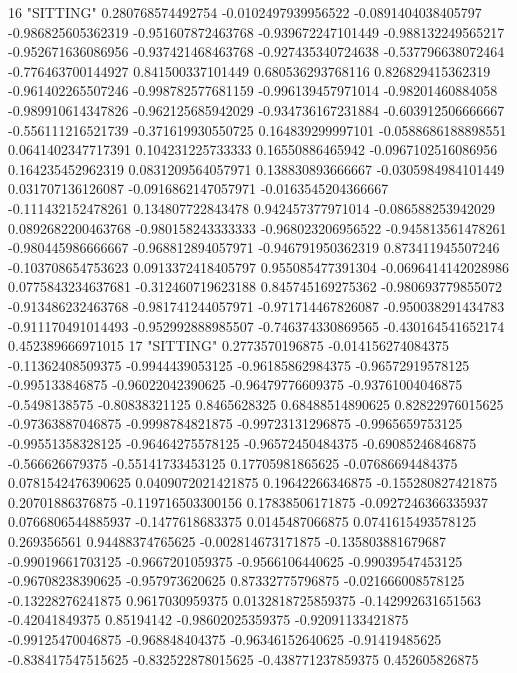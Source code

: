16 "SITTING" 0.280768574492754 -0.0102497939956522 -0.0891404038405797 -0.986825605362319 -0.951607872463768 -0.939672247101449 -0.988132249565217 -0.952671636086956 -0.937421468463768 -0.927435340724638 -0.537796638072464 -0.776463700144927 0.841500337101449 0.680536293768116 0.826829415362319 -0.961402265507246 -0.998782577681159 -0.996139457971014 -0.98201460884058 -0.989910614347826 -0.962125685942029 -0.934736167231884 -0.603912506666667 -0.556111216521739 -0.371619930550725 0.164839299997101 -0.0588686188898551 0.0641402347717391 0.104231225733333 0.16550886465942 -0.0967102516086956 0.164235452962319 0.0831209564057971 0.138830893666667 -0.0305984984101449 0.031707136126087 -0.0916862147057971 -0.0163545204366667 -0.111432152478261 0.134807722843478 0.942457377971014 -0.086588253942029 0.0892682200463768 -0.980158243333333 -0.968023206956522 -0.945813561478261 -0.980445986666667 -0.968812894057971 -0.946791950362319 0.873411945507246 -0.103708654753623 0.0913372418405797 0.955085477391304 -0.0696414142028986 0.0775843234637681 -0.312460719623188 0.845745169275362 -0.980693779855072 -0.913486232463768 -0.981741244057971 -0.971714467826087 -0.950038291434783 -0.911170491014493 -0.952992888985507 -0.746374330869565 -0.430164541652174 0.452389666971015
17 "SITTING" 0.2773570196875 -0.014156274084375 -0.11362408509375 -0.9944439053125 -0.96185862984375 -0.96572919578125 -0.995133846875 -0.96022042390625 -0.96479776609375 -0.93761004046875 -0.5498138575 -0.80838321125 0.8465628325 0.68488514890625 0.82822976015625 -0.97363887046875 -0.9998784821875 -0.99723131296875 -0.9965659753125 -0.99551358328125 -0.96464275578125 -0.96572450484375 -0.69085246846875 -0.566626679375 -0.55141733453125 0.17705981865625 -0.07686694484375 0.0781542476390625 0.0409072021421875 0.19642266346875 -0.155280827421875 0.20701886376875 -0.119716503300156 0.17838506171875 -0.0927246366335937 0.0766806544885937 -0.1477618683375 0.0145487066875 0.0741615493578125 0.269356561 0.94488374765625 -0.002814673171875 -0.135803881679687 -0.99019661703125 -0.9667201059375 -0.9566106440625 -0.99039547453125 -0.96708238390625 -0.957973620625 0.87332775796875 -0.021666008578125 -0.13228276241875 0.9617030959375 0.0132818725859375 -0.142992631651563 -0.42041849375 0.85194142 -0.98602025359375 -0.92091133421875 -0.99125470046875 -0.968848404375 -0.96346152640625 -0.91419485625 -0.838417547515625 -0.832522878015625 -0.438771237859375 0.452605826875
